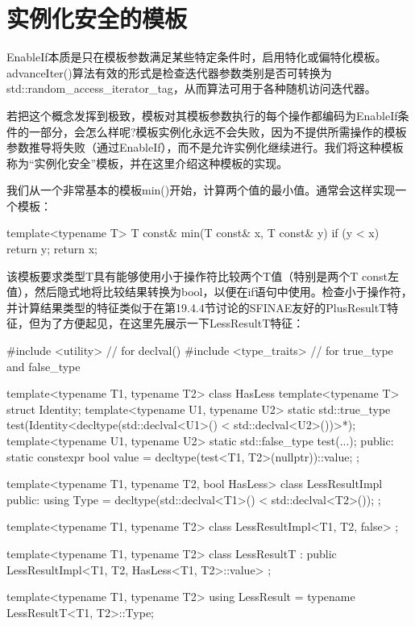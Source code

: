 \section{实例化安全的模板}
EnableIf本质是只在模板参数满足某些特定条件时，启用特化或偏特化模板。advanceIter()算法有效的形式是检查迭代器参数类别是否可转换为std::random\_access\_iterator\_tag，从而算法可用于各种随机访问迭代器。

若把这个概念发挥到极致，模板对其模板参数执行的每个操作都编码为EnableIf条件的一部分，会怎么样呢?模板实例化永远不会失败，因为不提供所需操作的模板参数推导将失败（通过EnableIf），而不是允许实例化继续进行。我们将这种模板称为“实例化安全”模板，并在这里介绍这种模板的实现。

我们从一个非常基本的模板min()开始，计算两个值的最小值。通常会这样实现一个模板：

\begin{cpp}
template<typename T>
T const& min(T const& x, T const& y)
{
	if (y < x) {
		return y;
	}
	return x;
}
\end{cpp}

该模板要求类型T具有能够使用小于操作符比较两个T值（特别是两个T const左值），然后隐式地将比较结果转换为bool，以便在if语句中使用。检查小于操作符，并计算结果类型的特征类似于在第19.4.4节讨论的SFINAE友好的PlusResultT特征，但为了方便起见，在这里先展示一下LessResultT特征：

\begin{cpp}
#include <utility> // for declval()
#include <type_traits> // for true_type and false_type

template<typename T1, typename T2>
class HasLess {
	template<typename T> struct Identity;
	template<typename U1, typename U2> static std::true_type
		test(Identity<decltype(std::declval<U1>() < std::declval<U2>())>*);
	template<typename U1, typename U2> static std::false_type
		test(...);
	public:
	static constexpr bool value = decltype(test<T1, T2>(nullptr))::value;
};

template<typename T1, typename T2, bool HasLess>
class LessResultImpl {
	public:
	using Type = decltype(std::declval<T1>() < std::declval<T2>());
};

template<typename T1, typename T2>
class LessResultImpl<T1, T2, false> {
};

template<typename T1, typename T2>
class LessResultT
: public LessResultImpl<T1, T2, HasLess<T1, T2>::value> {
};

template<typename T1, typename T2>
using LessResult = typename LessResultT<T1, T2>::Type;
\end{cpp}

